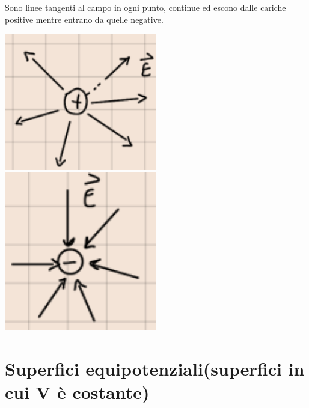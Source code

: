 \documentclass{book}
\begin{document}
Sono linee tangenti al campo in ogni punto, continue ed escono dalle cariche positive mentre entrano da quelle negative.

\begin{center}
	\includegraphics[width=0.5\textwidth]{left.png}
	\includegraphics[width=0.5\textwidth]{right.png}
\end{center}

\section{Superfici equipotenziali(superfici in cui V è costante)}
	
\end{document}
